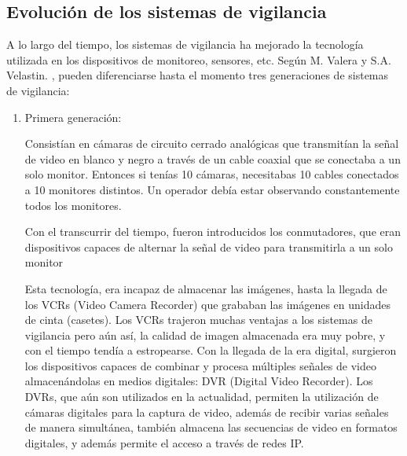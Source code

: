 \documentclass[a4paper,12pt,oneside,spanish]{book}
\begin{document}
\subsection{Evolución de los sistemas de vigilancia}
A lo largo del tiempo, los sistemas de vigilancia ha mejorado la tecnología utilizada en los dispositivos de monitoreo, sensores, etc. Según M. Valera y S.A. Velastin. \cite{valera}, pueden diferenciarse hasta el momento tres generaciones de sistemas de vigilancia:
\begin{enumerate}
	\baselineskip 16pt
	\item Primera generación: \par 
	Consistían en cámaras de circuito cerrado analógicas que transmitían la señal de video en blanco y negro a través de un cable coaxial que se conectaba a un solo monitor. Entonces si tenías 10 cámaras, necesitabas 10 cables conectados a 10 monitores distintos. Un operador debía estar observando constantemente todos los monitores. \par 
	Con el transcurrir del tiempo, fueron introducidos los conmutadores, que eran dispositivos capaces de alternar la señal de video para transmitirla a un solo monitor \par  
	Esta tecnología, era incapaz de almacenar las imágenes, hasta la llegada de los VCRs (Video Camera Recorder) que grababan las imágenes en unidades de cinta (casetes). Los VCRs trajeron muchas ventajas a los sistemas de vigilancia pero aún así, la calidad de imagen almacenada era muy pobre, y con el tiempo tendía a estropearse. Con la llegada de la era digital, surgieron los dispositivos capaces de combinar y procesa múltiples señales de video almacenándolas en medios digitales: DVR (Digital Video Recorder). Los DVRs, que aún son utilizados en la actualidad, permiten la utilización de cámaras digitales para la captura de video, además de recibir varias señales de manera simultánea, también almacena las secuencias de video en formatos digitales, y además permite el acceso a través de redes IP.\\	
	

\end{enumerate}
\end{document}
